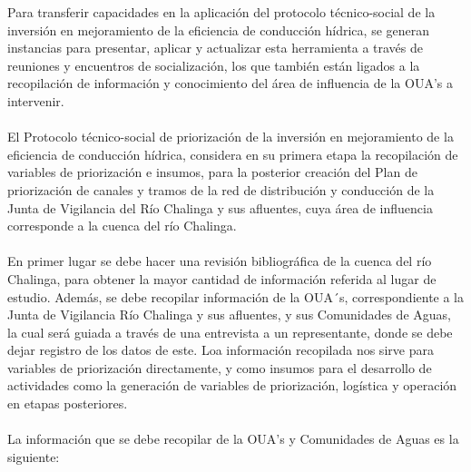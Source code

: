\documentclass[]{article}
\begin{document}
Para transferir capacidades en la aplicación del protocolo técnico-social de la inversión en mejoramiento de la eficiencia de conducción hídrica, se generan instancias para presentar, aplicar y actualizar esta herramienta a través de reuniones y encuentros de socialización, los que también están ligados a la recopilación de información y conocimiento del área de influencia de la OUA's a intervenir. \\
\\
El Protocolo técnico-social de priorización de la inversión en mejoramiento de la eficiencia de conducción hídrica, considera en su primera etapa la recopilación de variables de priorización e insumos, para la posterior creación del Plan de priorización de canales y tramos de la red de distribución y conducción de la Junta de Vigilancia del Río Chalinga y sus afluentes, cuya área de influencia corresponde a la cuenca del río Chalinga. \\
\\
En primer lugar se debe hacer una revisión bibliográfica de la cuenca del río Chalinga, para obtener la mayor cantidad de información referida al lugar de estudio. Además, se debe recopilar información de la OUA´s, correspondiente a la Junta de Vigilancia Río Chalinga y sus afluentes, y sus Comunidades de Aguas, la cual será guiada a través de una entrevista a un representante, donde se debe dejar registro de los datos de este. Loa información recopilada nos sirve para variables de priorización directamente, y como insumos para el desarrollo de actividades como la generación de variables de priorización, logística y operación en etapas posteriores. \\
\\
La información que se debe recopilar de la OUA's y Comunidades de Aguas es la siguiente:
\end{document}
